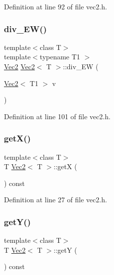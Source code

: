 Definition at line 92 of file vec2.\+h.

\mbox{\label{class_vec2_aeb4d68d3e251a49f71c598211c2f27d9}} 
\subsubsection{\texorpdfstring{div\_EW()}{div\_EW()}\hspace{0.1cm}{\footnotesize\ttfamily [2/2]}}
{\footnotesize\ttfamily template$<$class T$>$ \\
template$<$typename T1 $>$ \\
\mbox{\hyperlink{class_vec2}{Vec2}} \mbox{\hyperlink{class_vec2}{Vec2}}$<$ T $>$\+::div\+\_\+\+EW (\begin{DoxyParamCaption}\item[{\mbox{\hyperlink{class_vec2}{Vec2}}$<$ T1 $>$}]{v }\end{DoxyParamCaption})\hspace{0.3cm}{\ttfamily [inline]}}



Definition at line 101 of file vec2.\+h.

\mbox{\label{class_vec2_ab9c6aa483fc884d65a0f50a6426dce04}} 
\subsubsection{\texorpdfstring{getX()}{getX()}}
{\footnotesize\ttfamily template$<$class T$>$ \\
T \mbox{\hyperlink{class_vec2}{Vec2}}$<$ T $>$\+::getX (\begin{DoxyParamCaption}{ }\end{DoxyParamCaption}) const\hspace{0.3cm}{\ttfamily [inline]}}



Definition at line 27 of file vec2.\+h.

\mbox{\label{class_vec2_ab34c86af20c627cd5ed0e1a973a43fa3}} 
\subsubsection{\texorpdfstring{getY()}{getY()}}
{\footnotesize\ttfamily template$<$class T$>$ \\
T \mbox{\hyperlink{class_vec2}{Vec2}}$<$ T $>$\+::getY (\begin{DoxyParamCaption}{ }\end{DoxyParamCaption}) const\hspace{0.3cm}{\ttfamily [inline]}}



